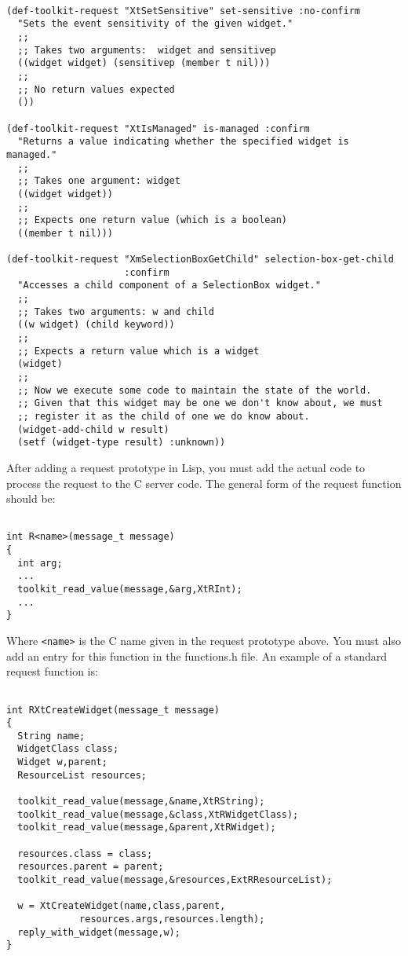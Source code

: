 \documentclass{article}
\begin{document}
\begin{verbatim}

(def-toolkit-request "XtSetSensitive" set-sensitive :no-confirm
  "Sets the event sensitivity of the given widget."
  ;;
  ;; Takes two arguments:  widget and sensitivep
  ((widget widget) (sensitivep (member t nil)))
  ;;
  ;; No return values expected
  ())

(def-toolkit-request "XtIsManaged" is-managed :confirm
  "Returns a value indicating whether the specified widget is managed."
  ;;
  ;; Takes one argument: widget
  ((widget widget))
  ;;
  ;; Expects one return value (which is a boolean)
  ((member t nil)))

(def-toolkit-request "XmSelectionBoxGetChild" selection-box-get-child
                     :confirm
  "Accesses a child component of a SelectionBox widget."
  ;;
  ;; Takes two arguments: w and child
  ((w widget) (child keyword))
  ;;
  ;; Expects a return value which is a widget
  (widget)
  ;;
  ;; Now we execute some code to maintain the state of the world.
  ;; Given that this widget may be one we don't know about, we must
  ;; register it as the child of one we do know about.
  (widget-add-child w result)
  (setf (widget-type result) :unknown))
\end{verbatim}

After adding a request prototype in Lisp, you must add the actual code
to process the request to the C server code.  The general form of the
request function should be:

\begin{verbatim}

int R<name>(message_t message)
{
  int arg;
  ...
  toolkit_read_value(message,&arg,XtRInt);
  ...
}
\end{verbatim}

Where \texttt{<name>} is the C name given in the request prototype
above.  You must also add an entry for this function in the
functions.h file.  An example of a standard request function is:

\begin{verbatim}

int RXtCreateWidget(message_t message)
{
  String name;
  WidgetClass class;
  Widget w,parent;
  ResourceList resources;

  toolkit_read_value(message,&name,XtRString);
  toolkit_read_value(message,&class,XtRWidgetClass);
  toolkit_read_value(message,&parent,XtRWidget);

  resources.class = class;
  resources.parent = parent;
  toolkit_read_value(message,&resources,ExtRResourceList);

  w = XtCreateWidget(name,class,parent,
		     resources.args,resources.length);
  reply_with_widget(message,w);
}
\end{verbatim}
\end{document}
